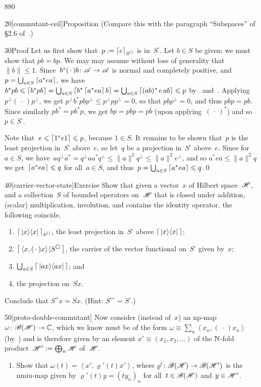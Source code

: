 \begin{parsec}{880}
\begin{point}{20}[commutant-ceil]{Proposition}
(Compare this with the paragraph ``Subspaces'' of \S2.6 of~\cite{kr}.)
\begin{point}{30}{Proof}%
Let us first show that~$p:= \left\lceil e\right\rceil_{S^\square}$
is in~$S^\square$.
Let $b\in S$ be given;
we must show that $pb=bp$.
We may may assume without loss of generality that~$\|b\|\leq 1$.
Since~$b^*(\,\cdot\,)b\colon \mathscr{A}\to\mathscr{A}$
is normal and completely positive,
and $p=\bigcup_{a\in S} \left\lceil a^*ea\right\rceil$,
we have $b^*pb\leqslant \left\lceil b^*pb\right\rceil = 
\bigcup_{a\in S} \left\lceil b^* \left\lceil a^* e a\right\rceil b \right\rceil
= \bigcup_{a\in S} \left\lceil(ab)^* \,e\, ab\right\rceil \leqslant p$
by~ and~.
Applying $p^\perp(\,\cdot\,)p^\perp$,
we get $p^\perp b^*pb p^\perp 
\leq p^\perp p p^\perp = 0$,
so that $pbp^\perp=0$,
and thus $pbp=pb$.
Since similarly $pb^* =pb^*p$,
we get  $bp=pbp=pb$
(upon applying~$(\,\cdot\,)^*$) and so~$p\in S^\square$.

Note that~$e\leqslant \left\lceil1^* e 1\right\rceil\leqslant p$, because $1\in S$.
It remains to be shown that~$p$ is the least projection in~$S^\square$
above~$e$, so let~$q$ be a projection in~$S^\square$ above~$e$.
Since for~$a\in S$,
we have~$aq^\perp a^*=  q^\perp aa^* q^\perp 
\leq \|a\|^2q^\perp \leq \|a\|^2e^\perp$,
and so $a^*ea\leq \|a\|^2q$ 
we get~$\left\lceil a^*ea\right\rceil\leqslant q$
for all~$a\in S$,
and thus~$p=\bigcup_{a\in S}\left\lceil a^*ea\right\rceil \leqslant q$.\qed
\end{point}
\end{point}
\begin{point}{40}[carrier-vector-state]{Exercise}%
Show that given a vector~$x$ of Hilbert space~$\mathscr{H}$,
and a collection~$S$ of bounded operators on~$\mathscr{H}$
that is closed under addition, (scalar) multiplication,
involution, and contains the identity operator,
the following coincide.
\begin{enumerate}
\item
$\left\lceil\,\left|x\right>\!\left<x\right|\,\right\rceil_{S^\square}$,
the least projection in~$S^\square$
above $\left\lceil\,\left|x\right>\!\left<x\right|\,\right\rceil$;
\item
$\left\lceil\,\left<x,(\,\cdot\,)x\right>|S^\square\,\right\rceil$,
the carrier of the vector functional on~$S^\square$
given by~$x$;
\item
$\bigcup_{a\in S} \left\lceil\,\left|ax\right>\!\left<ax\right|\,\right\rceil$; and 
\item
the projection on~$\overline{S x}$.
\end{enumerate}
Conclude that $\overline{S^{\square\square}x}
=\overline{S x}$.
(Hint: $S^{\square\square\square}=S^\square$.)
\begin{point}{50}[proto-double-commutant]%
Now consider
(instead of~$x$)
an np-map $\omega\colon \mathscr{B}(\mathscr{H})\to \mathbb{C}$,
which we know must be of the form
$\omega\equiv \sum_n \left<x_n,(\,\cdot\,)x_n\right>$
(by~)
and is therefore given by 
an element $x'\equiv (x_1,x_2,\dotsc)$ of the $\mathbb{N}$-fold
product~$\mathscr{H}':=\bigoplus_n\mathscr{H}$ of~$\mathscr{H}$.
\begin{enumerate}
\item
Show that  $\omega(t)=\left<x',\varrho'(t)x'\right>$,
where $\varrho'\colon \mathscr{B}(\mathscr{H})\to\mathscr{B}(\mathscr{H}')$
is the nmiu-map given by 
$\varrho'(t)y=(ty_n)_n$
for all~$t\in\mathscr{B}(\mathscr{H})$ and~$y\in\mathscr{H}'$.


\end{enumerate}
\end{point}
\end{point}
\end{parsec}
